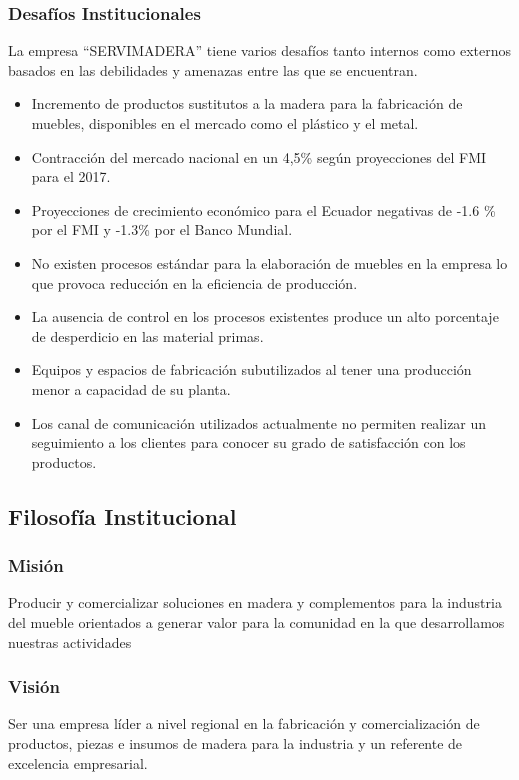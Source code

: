\documentclass[12pt, a4paper]{article}
\begin{document}
\subsubsection{Desafíos Institucionales}
La empresa ``SERVIMADERA'' tiene varios desafíos tanto internos como externos basados en las  debilidades y amenazas entre las que se encuentran.
\begin{itemize}
	\item Incremento de productos sustitutos a la madera para la fabricación de muebles, disponibles en el mercado como el plástico y el metal.
	\item Contracción del mercado nacional en un 4,5\% según proyecciones del FMI para el 2017.
	\item Proyecciones de crecimiento económico para el Ecuador negativas de  -1.6 \% por el FMI y -1.3\% por el Banco Mundial.
	\item No existen procesos estándar para la elaboración de muebles en la empresa lo que provoca  reducción en la eficiencia de producción.
	\item La ausencia de control en los procesos existentes   produce un alto porcentaje de desperdicio en las  material primas.
	\item Equipos y espacios de fabricación subutilizados al tener una producción menor a capacidad de su planta.
	\item Los canal de comunicación utilizados actualmente no permiten realizar un seguimiento a los clientes para conocer su grado de satisfacción con los productos.
\end{itemize}
	
\subsection{Filosofía Institucional}
\subsubsection{Misión}
Producir y comercializar soluciones en madera y complementos para la industria del mueble  orientados a generar valor para la comunidad en la que desarrollamos nuestras actividades
\subsubsection{Visión}
Ser una empresa líder a nivel regional en la fabricación y comercialización de productos, piezas e insumos de madera para la industria y un referente de excelencia empresarial.
\end{document}
